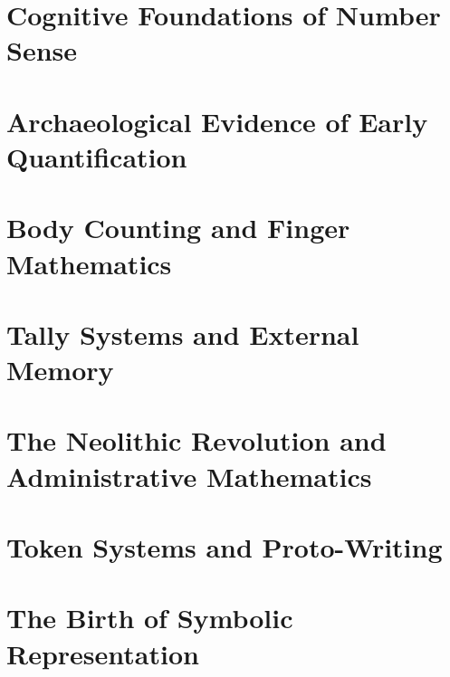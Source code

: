 \chapter{Cognitive Foundations of Number Sense  }
\chapter{Archaeological Evidence of Early Quantification  }
\chapter{Body Counting and Finger Mathematics  }
\chapter{Tally Systems and External Memory  }
\chapter{The Neolithic Revolution and Administrative Mathematics  }
\chapter{Token Systems and Proto-Writing  }
\chapter{The Birth of Symbolic Representation}